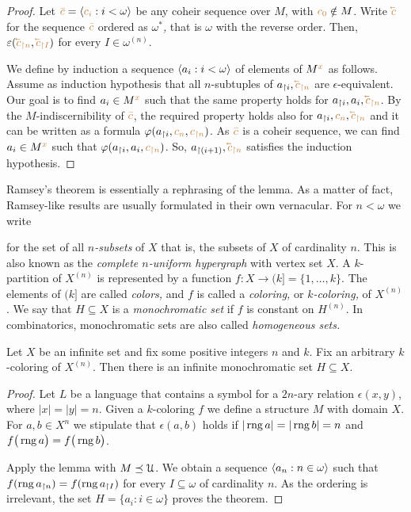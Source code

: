 \begin{proof}
  Let ${\color{brown}\bar c}=\langle{\color{brown}c_i}:i<\omega\rangle$ be any coheir sequence over $M$, with ${\color{brown} c_0}\notin M$.
  Write ${\mr \cev{c}}$ for the sequence ${\color{brown}\bar c}$ ordered as \emph{$\omega^*$,} that is $\omega$ with the reverse order.
  Then, $\epsilon({\mr \cev{c}_{\restriction n}},{\mr \cev{c}_{\restriction I}})$ for every $I\in\omega^{(n)}$.

  We define by induction a sequence $\langle a_i:i<\omega\rangle$ of elements of $M^{\color{brown} x}$ as follows.
  Assume as induction hypothesis that all $n$-subtuples of $a_{\restriction i},{\mr \cev{c}_{\restriction n}}$ are $\epsilon$-equivalent.
  Our goal is to find $a_i\in M^{\color{brown} x}$ such that the same property holds for $a_{\restriction i},a_i,{\mr \cev{c}_{\restriction n}}$.
  By the $M$-indiscernibility of ${\color{brown}\bar c}$, the required property holds also for $a_{\restriction i},{\mr{c_n}},{\mr \cev{c}_{\restriction n}}$ and it can be written as a formula $\varphi(a_{\restriction i},{\color{brown}{c_n}},{\color{brown} c_{\restriction n}})$.
  As ${\color{brown}\bar c}$ is a coheir sequence, we can find  $a_i\in M^{\color{brown} x}$ such that  $\varphi(a_{\restriction i},a_i,{\color{brown} c_{\restriction n}})$.
  So, $a_{\restriction (i+1)},{\mr \cev{c}_{\restriction n}}$ satisfies the induction hypothesis.
\end{proof}

Ramsey's theorem is essentially a rephrasing of the lemma.
As a matter of fact, Ramsey-like results are usually formulated in their own vernacular.
For $n<\omega$ we write 


for the set of all \emph{$n$-subsets} of $X$ that is, the subsets of $X$ of cardinality $n$.
This is also known as the \emph{complete $n$-uniform hypergraph\/} with vertex set $X$.
A $k$-partition of $X^{(n)}$ is represented by a function $f:X\to (k]=\{1,\dots,k\}$.
The elements of $(k]$ are called \emph{colors,} and $f$ is called a \emph{coloring,}
or \emph{$k$-coloring,} of $X^{(n)}$.
We say that $H\subseteq X$ is a \emph{monochromatic set\/} if $f$ is constant on $H^{(n)}$.
In combinatorics, monochromatic sets are also called \emph{homogeneous sets.}

\begin{void}
Let $X$ be an infinite set and fix some positive integers $n$ and $k$.
Fix an arbitrary $k$-coloring of $X^{(n)}$.
Then there is an infinite monochromatic set $H\subseteq X$.
\end{void}
\begin{proof}
Let $L$ be a language that contains a symbol for a $2n$-ary relation $\epsilon(x,y)$, where $|x|=|y|=n$.
Given a $k$-coloring $f$ we define a structure $M$ with domain $X$.
For $a,b\in X^n$ we stipulate that $\epsilon(a,b)$ holds if $|\mathop{\rm rng} a|=|\mathop{\rm rng} b|=n$  and $f\big(\mathop{\rm rng} a\big)= f\big(\mathop{\rm rng} b\big)$.

Apply the lemma with $M\preceq\EuScript U$.
We obtain a sequence $\langle a_n:n\in\omega\rangle$ such that $f(\mathop{\rm rng} a_{\restriction n})=f(\mathop{\rm rng} a_{\restriction I})$ for every $I\subseteq\omega$ of cardinality $n$.
As the ordering is irrelevant, the set $H=\{a_i:i\in\omega\}$ proves the theorem.
\end{proof}

